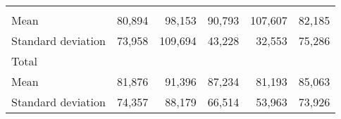 \begin{tabular}{llllll}
  \multicolumn{1}{|r}{} &
  \multicolumn{1}{r}{} &
  \multicolumn{1}{r}{} &
  \multicolumn{1}{r}{} &
  \multicolumn{1}{r}{} \\
\multicolumn{1}{l}{\hspace{4em}Mean} &
  \multicolumn{1}{|r}{80,894} &
  \multicolumn{1}{r}{98,153} &
  \multicolumn{1}{r}{90,793} &
  \multicolumn{1}{r}{107,607} &
  \multicolumn{1}{r}{82,185} \\
\multicolumn{1}{l}{\hspace{4em}Standard deviation} &
  \multicolumn{1}{|r}{73,958} &
  \multicolumn{1}{r}{109,694} &
  \multicolumn{1}{r}{43,228} &
  \multicolumn{1}{r}{32,553} &
  \multicolumn{1}{r}{75,286} \\
\multicolumn{1}{l}{\hspace{3em}Total} &
  \multicolumn{1}{|r}{} &
  \multicolumn{1}{r}{} &
  \multicolumn{1}{r}{} &
  \multicolumn{1}{r}{} &
  \multicolumn{1}{r}{} \\
\multicolumn{1}{l}{\hspace{4em}Mean} &
  \multicolumn{1}{|r}{81,876} &
  \multicolumn{1}{r}{91,396} &
  \multicolumn{1}{r}{87,234} &
  \multicolumn{1}{r}{81,193} &
  \multicolumn{1}{r}{85,063} \\
\multicolumn{1}{l}{\hspace{4em}Standard deviation} &
  \multicolumn{1}{|r}{74,357} &
  \multicolumn{1}{r}{88,179} &
  \multicolumn{1}{r}{66,514} &
  \multicolumn{1}{r}{53,963} &
  \multicolumn{1}{r}{73,926} \\
\cline{1-6}
\end{tabular}

